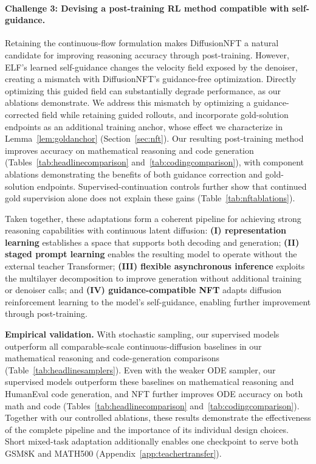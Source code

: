\documentclass{article}
\newcommand{\rev}[1]{{\color{blue}#1}}
\newcommand{\revp}[1]{\par\color{blue}#1\par\color{black}}
\begin{document}
\paragraph{\rev{Challenge 3: Devising a post-training RL method compatible with self-guidance.}}
\revp{Retaining the continuous-flow formulation makes DiffusionNFT
\citep{diffusionnft} a natural candidate for improving reasoning
accuracy through post-training. However, ELF's learned self-guidance
changes the velocity field exposed by the denoiser, creating a
mismatch with DiffusionNFT's guidance-free optimization. Directly
optimizing this guided field can substantially degrade performance,
as our ablations demonstrate. We address this mismatch by optimizing
a guidance-corrected field while retaining guided rollouts, and
incorporate gold-solution endpoints as an additional training anchor,
whose effect we characterize in Lemma~\ref{lem:goldanchor}
(Section~\ref{sec:nft}). Our resulting post-training method improves
accuracy on mathematical reasoning and code generation
(Tables~\ref{tab:headlinecomparison} and~\ref{tab:codingcomparison}),
with component ablations demonstrating the benefits of both
guidance correction and gold-solution endpoints. Supervised-continuation
controls further show that continued gold supervision alone does not
explain these gains (Table~\ref{tab:nftablations}).}

\label{sec:contributions}
\revp{Taken together, these adaptations form a coherent pipeline for
achieving strong reasoning capabilities with continuous latent
diffusion: \textbf{(I) representation learning} establishes a space
that supports both decoding and generation;
\textbf{(II) staged prompt learning} enables the resulting model
to operate without the external teacher Transformer;
\textbf{(III) flexible asynchronous inference} exploits the
multilayer decomposition to improve generation without additional
training or denoiser calls; and
\textbf{(IV) guidance-compatible NFT} adapts diffusion reinforcement
learning to the model's self-guidance, enabling further improvement
through post-training.}

\revp{\textbf{Empirical validation.}
With stochastic sampling, our supervised models outperform all
comparable-scale continuous-diffusion baselines in our mathematical
reasoning and code-generation comparisons
(Table~\ref{tab:headlinesamplers}).
Even with the weaker ODE sampler, our supervised models outperform
these baselines on mathematical reasoning and HumanEval code
generation, and NFT further improves ODE accuracy on both math
and code
(Tables~\ref{tab:headlinecomparison} and~\ref{tab:codingcomparison}).
Together with our controlled ablations, these results demonstrate
the effectiveness of the complete pipeline and the importance
of its individual design choices. Short mixed-task adaptation
additionally enables one checkpoint to serve both GSM8K and MATH500
(Appendix~\ref{app:teachertransfer}).}
\end{document}
